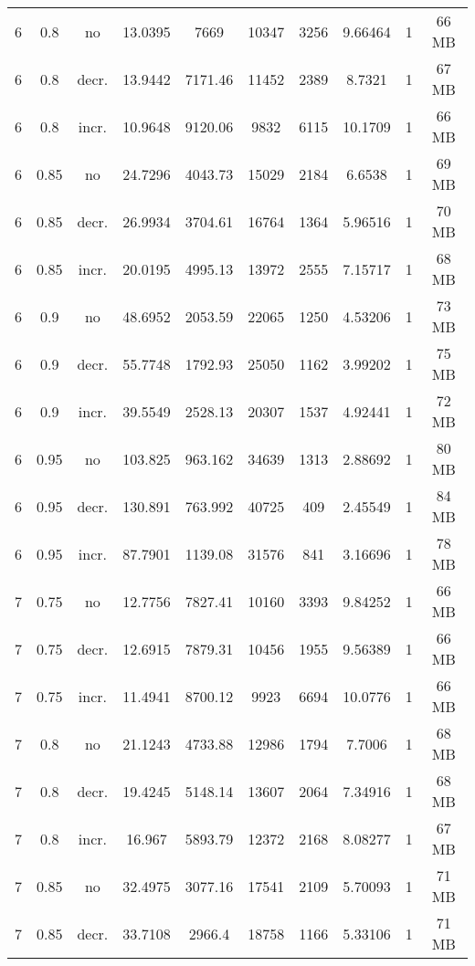 \begin{longtable}{c|c|c|c|c|c|c|c|c|c}
  \hline
  6  &  0.8   & no    & 13.0395  &  7669    &  10347  &  3256  &  9.66464  &  1  & 66  MB \\
  6  &  0.8   & decr. & 13.9442  &  7171.46 &  11452  &  2389  &  8.7321   &  1  & 67  MB \\
  6  &  0.8   & incr. & 10.9648  &  9120.06 &  9832   &  6115  &  10.1709  &  1  & 66  MB \\
  \hline
  6  &  0.85  & no    & 24.7296  &  4043.73 &  15029  &  2184  &  6.6538   &  1  & 69  MB \\
  6  &  0.85  & decr. & 26.9934  &  3704.61 &  16764  &  1364  &  5.96516  &  1  & 70  MB \\
  6  &  0.85  & incr. & 20.0195  &  4995.13 &  13972  &  2555  &  7.15717  &  1  & 68  MB \\
  \hline
  6  &  0.9   & no    & 48.6952  &  2053.59 &  22065  &  1250  &  4.53206  &  1  & 73  MB \\
  6  &  0.9   & decr. & 55.7748  &  1792.93 &  25050  &  1162  &  3.99202  &  1  & 75  MB \\
  6  &  0.9   & incr. & 39.5549  &  2528.13 &  20307  &  1537  &  4.92441  &  1  & 72  MB \\
  \hline
  6  &  0.95  & no    & 103.825  &  963.162 &  34639  &  1313  &  2.88692  &  1  & 80  MB \\
  6  &  0.95  & decr. & 130.891  &  763.992 &  40725  &  409   &  2.45549  &  1  & 84  MB \\
  6  &  0.95  & incr. & 87.7901  &  1139.08 &  31576  &  841   &  3.16696  &  1  & 78  MB \\
  \hline
  7  &  0.75  & no    & 12.7756  &  7827.41 &  10160  &  3393  &  9.84252  &  1  & 66  MB \\
  7  &  0.75  & decr. & 12.6915  &  7879.31 &  10456  &  1955  &  9.56389  &  1  & 66  MB \\
  7  &  0.75  & incr. & 11.4941  &  8700.12 &  9923   &  6694  &  10.0776  &  1  & 66  MB \\
  \hline
  7  &  0.8   & no    & 21.1243  &  4733.88 &  12986  &  1794  &  7.7006   &  1  & 68  MB \\
  7  &  0.8   & decr. & 19.4245  &  5148.14 &  13607  &  2064  &  7.34916  &  1  & 68  MB \\
  7  &  0.8   & incr. & 16.967   &  5893.79 &  12372  &  2168  &  8.08277  &  1  & 67  MB \\
  \hline
  7  &  0.85  & no    & 32.4975  &  3077.16 &  17541  &  2109  &  5.70093  &  1  & 71  MB \\
  7  &  0.85  & decr. & 33.7108  &  2966.4  &  18758  &  1166  &  5.33106  &  1  & 71  MB \\

\end{longtable}
